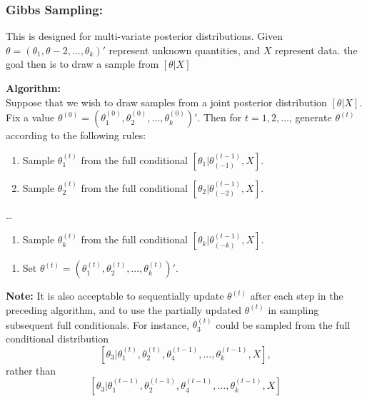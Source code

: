 \documentclass[12pt,oneside,a4paper]{book}
\theoremstyle{definition}
\theoremstyle{remark}
\begin{document}
				\subsubsection{Gibbs Sampling:}
					This is designed for multi-variate posterior distributions. Given $\theta=(\theta_1,\theta-2,\dots,\theta_k)'$ represent unknown quantities, and $X$ represent data. the goal then is to draw a sample from $[\theta|X]$

					\textbf{Algorithm:}\\
					Suppose that we wish to draw samples from a joint posterior distribution $[\theta|X]$.\\
					Fix a value $\theta^{(0)} = (\theta^{(0)}_1 ,\theta^{(0)}_2,\dots ,\theta^{(0)}_k)'$. Then for $t= 1,2,\dots$, generate $\theta^{(t)}$ according to the following rules:

					\begin{enumerate}
						\item Sample $\theta_1^{(t)}$ from the full conditional $[\theta_1|\theta^{(t-1)}_{(-1)},X]$.
						\item Sample $\theta_2^{(t)}$ from the full conditional $[\theta_2|\theta^{(t-1)}_{(-2)},X]$.
					\end{enumerate}
					\dots
					\begin{enumerate}
						\item Sample $\theta_k^{(t)}$ from the full conditional $[\theta_k|\theta^{(t-1)}_{(-k)},X]$.
					\end{enumerate}
					\begin{enumerate}
						\item Set  $\theta^{(t)} = (\theta^{(t)}_1 ,\theta^{(t)}_2,\dots ,\theta^{(t)}_k)'$.
					\end{enumerate}

					\textbf{Note:} It is also acceptable to sequentially update $\theta^{(t)}$ after each step in the preceding algorithm, and to use the partially updated $\theta^{(t)}$ in sampling subsequent full conditionals. For instance, $\theta^{(t)}_3$ could be sampled from the full conditional distribution
					\[
						[\theta_3|\theta_1^{(t)},\theta_2^{(t)},\theta_4^{(t-1)},\dots,\theta_k^{(t-1)},X],
					\]rather than
					\[
						[\theta_3|\theta_1^{(t-1)},\theta_2^{(t-1)},\theta_4^{(t-1)},\dots,\theta_k^{(t-1)},X]
					\]
\end{document}
